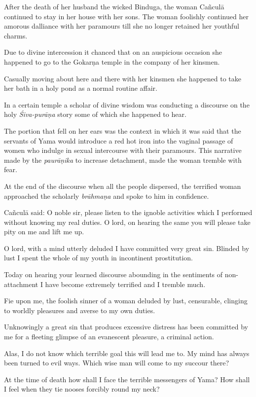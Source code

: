 \documentclass[twoside]{purana}
\begin{document}
After the death of her husband the wicked Binduga, the woman Cañculā continued
to stay in her house with her sons. The woman foolishly continued her amorous
dalliance with her paramours till she no longer retained her youthful charms.

Due to divine intercession it chanced that on an auspicious occasion she
happened to go to the Gokarṇa temple in the company of her kinsmen.

Casually moving about here and there with her kinsmen she happened to take her
bath in a holy pond as a normal routine affair.

In a certain temple a scholar of divine wisdom was conducting a discourse on
the holy \emph{Śiva-purāṇa} story some of which she happened to hear.

The portion that fell on her ears was the context in which it was said that
the servants of Yama would introduce a red hot iron into the vaginal passage of
women who indulge in sexual intercourse with their paramours. This narrative
made by the \emph{paurāṇika} to increase detachment, made the woman tremble
with fear.

At the end of the discourse when all the people dispersed, the terrified woman
approached the scholarly \emph{brāhmaṇa} and spoke to him in confidence.

Cañculā said: O noble sir, please listen to the ignoble activities which I
performed without knowing my real duties. O lord, on hearing the same you will
please take pity on me and lift me up.

O lord, with a mind utterly deluded I have committed very great sin. Blinded by
lust I spent the whole of my youth in incontinent prostitution.

Today on hearing your learned discourse abounding in the sentiments of
non-attachment I have become extremely terrified and I tremble much.

Fie upon me, the foolish sinner of a woman deluded by lust, censurable,
clinging to worldly pleasures and averse to my own duties.

Unknowingly a great sin that produces excessive distress has been committed by
me for a fleeting glimpse of an evanescent pleasure, a criminal action.

Alas, I do not know which terrible goal this will lead me to. My mind has always
been turned to evil ways. Which wise man will come to my succour there?

At the time of death how shall I face the terrible messengers of Yama? How shall
I feel when they tie nooses forcibly round my neck?
\end{document}
